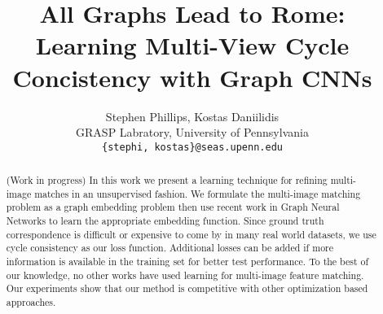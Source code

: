 \documentclass[10pt,twocolumn,letterpaper]{article}
\begin{document}
\title{All Graphs Lead to Rome: Learning Multi-View Cycle Concistency with Graph CNNs}

\author{Stephen Phillips, Kostas Daniilidis \\
GRASP Labratory, University of Pennsylvania\\
{\tt\small \{stephi, kostas\}@seas.upenn.edu}
}



\maketitle


\begin{abstract}
   (Work in progress) In this work we present a learning technique for refining multi-image matches in an unsupervised fashion.
   We formulate the multi-image matching problem as a graph embedding problem then use recent work in Graph Neural Networks to learn the appropriate embedding function.
   Since ground truth correspondence is difficult or expensive to come by in many real world datasets, we use cycle consistency as our loss function.
   Additional losses can be added if more information is available in the training set for better test performance.
   To the best of our knowledge, no other works have used learning for multi-image feature matching.
   Our experiments show that our method is competitive with other optimization based approaches.
\end{abstract}
\end{document}
